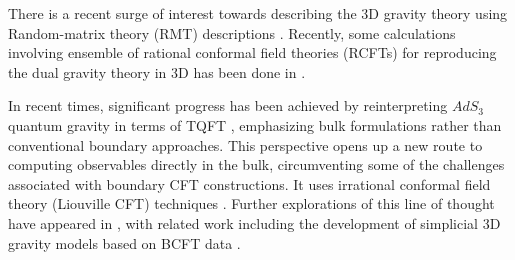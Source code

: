 \documentclass[12 pt]{article}
\begin{document}
There is a recent surge of interest towards describing the 3D gravity theory using Random-matrix theory (RMT) descriptions \cite{DiUbaldo:2023qli,Boruch:2025ilr}. Recently, some calculations involving ensemble of rational conformal field theories (RCFTs) for reproducing the dual gravity theory in 3D has been done in \cite{Castro:2011zq,Barbar:2023ncl,Dymarsky:2024frx,Dymarsky:2026lnf,Barbar:2025vvf}.  \\ \par
In recent times, significant progress has been achieved by reinterpreting $AdS_3$ quantum gravity in terms of TQFT  \cite{Belin:2026pko,Cotler:2016fpe,Collier:2024mgv,Post:2024itb,Yan:2023rjh,Yin:2007gv,Yan:2025usw, Aghaei:2015bqi,Aghaei:2020otq,Poghosyan:2016kvd,Takahashi:2024ukk}, emphasizing bulk formulations rather than conventional boundary approaches. This perspective opens up a new route to computing observables directly in the bulk, circumventing some of the challenges associated with boundary CFT constructions. It uses irrational conformal field theory (Liouville CFT) techniques \cite{Nakayama:2004vk,Zamolodchikov:2001ah,Ponsot:1999uf,Suchanek:2010kq,Belavin:2007eq}. Further explorations of this line of thought have appeared in \cite{Hung:2024gma}, with related work including the development of simplicial 3D gravity models based on BCFT data \cite{Hung:2024gma,Geng:2025efs}.
\\ \par
\end{document}
